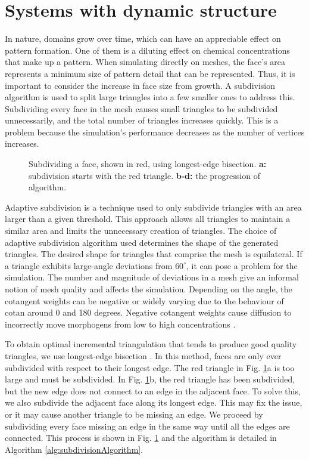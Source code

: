 \section{Systems with dynamic structure}
In nature, domains grow over time, which can have an appreciable effect on pattern formation. One of them is a diluting effect on chemical concentrations that make up a pattern. When simulating directly on meshes, the face's area represents a minimum size of pattern detail that can be represented. Thus, it is important to consider the increase in face size from growth. A subdivision algorithm is used to split large triangles into a few smaller ones to address this. Subdividing every face in the mesh causes small triangles to be subdivided unnecessarily, and the total number of triangles increases quickly. This is a problem because the simulation's performance decreases as the number of vertices increases. 

\begin{figure}[H]
	\centering
	\caption{Subdividing a face, shown in red, using longest-edge bisection. \textbf{a:} subdivision starts with the red triangle. \textbf{b-d:} the progression of algorithm.} 
	\label{fig:recursiveSubdiv}
\end{figure}

Adaptive subdivision is a technique used to only subdivide triangles with an area larger than a given threshold. This approach allows all triangles to maintain a similar area and limits the unnecessary creation of triangles. The choice of adaptive subdivision algorithm used determines the shape of the generated triangles. The desired shape for triangles that comprise the mesh is equilateral. If a triangle exhibits large-angle deviations from $60^{\circ}$, it can pose a problem for the simulation. The number and magnitude of deviations in a mesh give an informal notion of mesh quality and affects the simulation. Depending on the angle, the cotangent weights can be negative or widely varying due to the behaviour of cotan around 0 and 180 degrees. Negative cotangent weights cause diffusion to incorrectly move morphogens from low to high concentrations \citep{wardetzky2007}. 

To obtain optimal incremental triangulation that tends to produce good quality triangles, we use longest-edge bisection \citep{rivara1998}. In this method, faces are only ever subdivided with respect to their longest edge. The red triangle in Fig. \ref{fig:recursiveSubdiv}a is too large and must be subdivided. In Fig. \ref{fig:recursiveSubdiv}b, the red triangle has been subdivided, but the new edge does not connect to an edge in the adjacent face. To solve this, we also subdivide the adjacent face along its longest edge. This may fix the issue, or it may cause another triangle to be missing an edge. We proceed by subdividing every face missing an edge in the same way until all the edges are connected. This process is shown in Fig. \ref{fig:recursiveSubdiv} and the algorithm is detailed in Algorithm \ref{alg:subdivisionAlgorithm}. 

